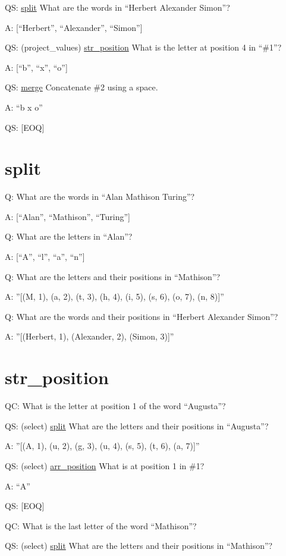\documentclass[
]{article}
\begin{document}
QS: \hyperref[split]{split} What are the words in ``Herbert Alexander
Simon''?

A: {[}``Herbert'', ``Alexander'', ``Simon''{]}

QS: (project\_values) \hyperref[str_position]{str\_position} What is the
letter at position 4 in ``\#1''?

A: {[}``b'', ``x'', ``o''{]}

QS: \hyperref[merge]{merge} Concatenate \#2 using a space.

A: ``b x o''

QS: {[}EOQ{]}

\section{split}\label{split}

Q: What are the words in ``Alan Mathison Turing''?

A: {[}``Alan'', ``Mathison'', ``Turing''{]}

Q: What are the letters in ``Alan''?

A: {[}``A'', ``l'', ``a'', ``n''{]}

Q: What are the letters and their positions in ``Mathison''?

A: ''{[}(M, 1), (a, 2), (t, 3), (h, 4), (i, 5), (s, 6), (o, 7), (n,
8){]}''

Q: What are the words and their positions in ``Herbert Alexander
Simon''?

A: ''{[}(Herbert, 1), (Alexander, 2), (Simon, 3){]}''

\section{str\_position}\label{str_position}

QC: What is the letter at position 1 of the word ``Augusta''?

QS: (select) \hyperref[split]{split} What are the letters and their
positions in ``Augusta''?

A: ''{[}(A, 1), (u, 2), (g, 3), (u, 4), (s, 5), (t, 6), (a, 7){]}''

QS: (select) \hyperref[arr_position]{arr\_position} What is at position
1 in \#1?

A: ``A''

QS: {[}EOQ{]}

QC: What is the last letter of the word ``Mathison''?

QS: (select) \hyperref[split]{split} What are the letters and their
positions in ``Mathison''?
\end{document}
